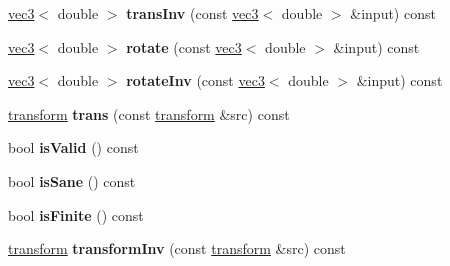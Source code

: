 \begin{DoxyCompactItemize}
\item 
\hypertarget{classmath_1_1transform_ac0c94ed41fea36a40bd964446d808ffe}{
\hyperlink{classmath_1_1vec3}{vec3}$<$ double $>$ {\bfseries transInv} (const \hyperlink{classmath_1_1vec3}{vec3}$<$ double $>$ \&input) const }
\label{classmath_1_1transform_ac0c94ed41fea36a40bd964446d808ffe}

\item 
\hypertarget{classmath_1_1transform_a67377b76d15b48fffd1be3988b1cc691}{
\hyperlink{classmath_1_1vec3}{vec3}$<$ double $>$ {\bfseries rotate} (const \hyperlink{classmath_1_1vec3}{vec3}$<$ double $>$ \&input) const }
\label{classmath_1_1transform_a67377b76d15b48fffd1be3988b1cc691}

\item 
\hypertarget{classmath_1_1transform_a73045bcd374dd5bd3bf7c42057d39975}{
\hyperlink{classmath_1_1vec3}{vec3}$<$ double $>$ {\bfseries rotateInv} (const \hyperlink{classmath_1_1vec3}{vec3}$<$ double $>$ \&input) const }
\label{classmath_1_1transform_a73045bcd374dd5bd3bf7c42057d39975}

\item 
\hypertarget{classmath_1_1transform_a12467961279f90b26cf858260ccce0b8}{
\hyperlink{classmath_1_1transform}{transform} {\bfseries trans} (const \hyperlink{classmath_1_1transform}{transform} \&src) const }
\label{classmath_1_1transform_a12467961279f90b26cf858260ccce0b8}

\item 
\hypertarget{classmath_1_1transform_ac5afd8a4548800318050e842f6b29f5d}{
bool {\bfseries isValid} () const }
\label{classmath_1_1transform_ac5afd8a4548800318050e842f6b29f5d}

\item 
\hypertarget{classmath_1_1transform_abca3764f3b4dbe833f2efb8a51810a08}{
bool {\bfseries isSane} () const }
\label{classmath_1_1transform_abca3764f3b4dbe833f2efb8a51810a08}

\item 
\hypertarget{classmath_1_1transform_a537f54782d021825c96ac4aba329fae6}{
bool {\bfseries isFinite} () const }
\label{classmath_1_1transform_a537f54782d021825c96ac4aba329fae6}

\item 
\hypertarget{classmath_1_1transform_afc0c8360bc9ee857e3d7d0351808758d}{
\hyperlink{classmath_1_1transform}{transform} {\bfseries transformInv} (const \hyperlink{classmath_1_1transform}{transform} \&src) const }
\label{classmath_1_1transform_afc0c8360bc9ee857e3d7d0351808758d}


\end{DoxyCompactItemize}
